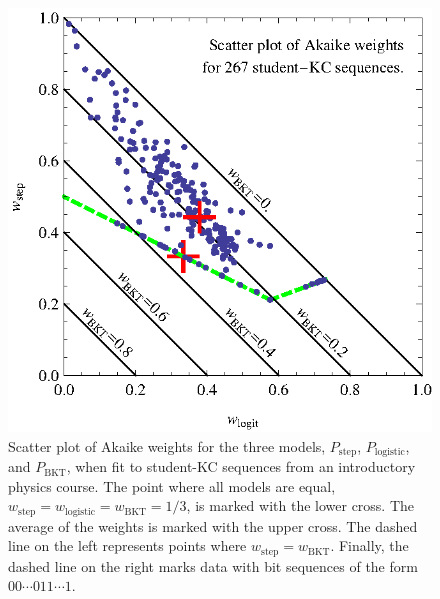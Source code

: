 \documentclass{edm_template}
\begin{document}
\begin{figure}[t]
  \centering \includegraphics{scatter-weights.eps}
  \caption{Scatter plot of  Akaike weights for the three models, 
   $P_\mathrm{step}$, $P_\mathrm{logistic}$, and $P_\mathrm{BKT}$, 
   when fit to student-KC sequences from an introductory physics course.
   The point where all models are equal,
   $w_\mathrm{step}=w_\mathrm{logistic}=w_\mathrm{BKT}=1/3$, is
   marked with the lower cross.  
   The average of the  weights is marked with
   the upper cross.
  The dashed line on the left represents points
   where $w_\mathrm{step}=w_\mathrm{BKT}$.  Finally, the dashed line on 
   the right marks data with bit sequences of the form
   $00\cdots 011\cdots 1$.} 
   \label{scatter1}
\end{figure}
\end{document}
